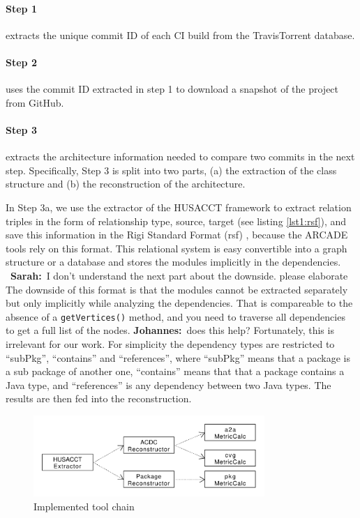 \documentclass[sigplan, anonymous, review]{acmart}
\newcommand{\sn}[1]{{\color{blue}\textbf{Sarah:}~#1}}
\newcommand{\jk}[1]{{\color{violet}\textbf{Johannes:}~#1}}
\begin{document}
\paragraph{Step 1} extracts the unique commit ID of each CI build from the TravisTorrent database.

\paragraph{Step 2} uses the commit ID extracted in step 1 to download a snapshot of the project from GitHub.


\paragraph{Step 3} extracts the architecture information needed to compare two commits in the next step. 
Specifically, Step 3 is split into two parts, (a) the extraction of the class structure and (b) the reconstruction of the architecture. 

In Step 3a, we use the extractor of the HUSACCT framework \cite{Husacct1} to extract relation triples in the form of relationship type, source, target (see listing \ref{lst1:rsf}), and save this information in the Rigi Standard Format (rsf) \cite{RSF}, because the ARCADE tools rely on this format. This relational system is easy convertible into a graph structure or a database and stores the modules implicitly in the dependencies. 
~\sn{I don't understand the next part about the downside. please elaborate} The downside of this format is that the modules cannot be extracted separately but only implicitly while analyzing the dependencies. That is compareable to the absence of a \texttt{getVertices()} method, and you need to traverse all dependencies to get a full list of the nodes. \jk{does this help?}
Fortunately, this is irrelevant for our work. For simplicity the dependency types are restricted to ``subPkg'', ``contains'' and ``references'', where ``subPkg'' means that a package is a sub package of another one, ``contains'' means that that a package contains a Java type, and ``references'' is any dependency between two Java types. The results are then fed into the reconstruction.

\begin{figure}[!t]
	\centering
	\includegraphics[width=3.45in]{assets/implementedArc.pdf}
	\caption{Implemented tool chain}
	\label{implToolchain}
\end{figure}
\end{document}
